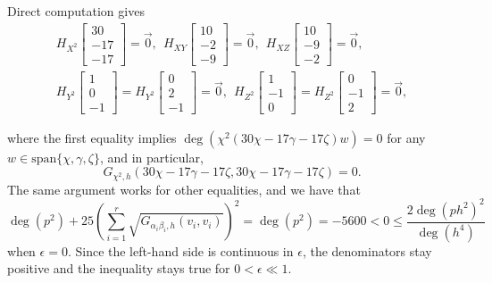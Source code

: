 Direct computation gives
\begin{gather*}
    H_{X^2}\begin{bmatrix}
        30\\-17\\-17
    \end{bmatrix}=\vec 0, \ \ H_{XY}\begin{bmatrix}
       10 \\ -2 \\ -9 
    \end{bmatrix}=\vec 0,\ \ 
    H_{XZ}\begin{bmatrix}
       10 \\ -9 \\ -2
    \end{bmatrix}=\vec 0,\\
    H_{Y^2}\begin{bmatrix}
       1 \\ 0 \\ -1
    \end{bmatrix}=H_{Y^2}\begin{bmatrix}
       0 \\ 2 \\ -1
    \end{bmatrix}=\vec 0,\ \ 
    H_{Z^2}\begin{bmatrix}
       1 \\ -1 \\ 0
    \end{bmatrix}=H_{Z^2}\begin{bmatrix}
       0 \\ -1 \\ 2
    \end{bmatrix}=\vec 0,
\end{gather*}

where the first equality implies $\deg(\chi^2(30\chi-17\gamma-17\zeta)w)=0$ for any $w\in \mathrm{span}\{\chi,\gamma,\zeta\}$, and in particular,
\[
    G_{\chi^2,h}(30\chi-17\gamma-17\zeta,30\chi-17\gamma-17\zeta)=0.
\]
The same argument works for other equalities, and we have that
\[
    \deg(p^2)+25\left(\sum_{i=1}^r\sqrt{G_{\alpha_i\beta_i,h}(v_i,v_i)}\right)^2=\deg(p^2)=-5600<0\leq \frac{2\deg(ph^2)^2}{\deg(h^4)}
\]
when $\epsilon=0$. Since the left-hand side is continuous in $\epsilon$, the denominators stay positive and the inequality stays true for $0<\epsilon\ll 1$.

